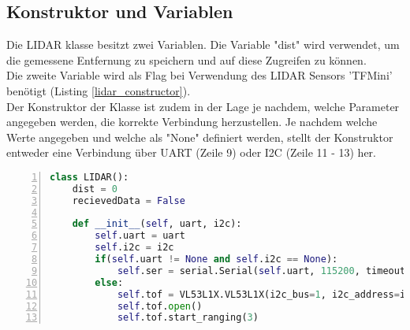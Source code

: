 \subsection{Konstruktor und Variablen}
Die \ac{LIDAR} klasse besitzt zwei Variablen. Die Variable "dist" wird verwendet, um die gemessene Entfernung zu speichern und auf diese Zugreifen zu können.\\
Die zweite Variable wird als Flag bei Verwendung des \ac{LIDAR} Sensors 'TFMini'  benötigt (Listing \ref{lidar_constructor}).\\
Der Konstruktor der Klasse ist zudem in der Lage je nachdem, welche Parameter angegeben werden, die korrekte Verbindung herzustellen. Je nachdem welche Werte angegeben und welche als "None"  definiert werden, stellt der Konstruktor entweder eine Verbindung über \ac{UART} (Zeile 9) oder \ac{I2C} (Zeile 11 - 13) her. 
\begin{lstlisting}[caption={Kostruktor der Lidar Klasse}, language={Python}, label={lidar_constructor}, numbers=left]
class LIDAR():
    dist = 0
    recievedData = False

    def __init__(self, uart, i2c):
        self.uart = uart
        self.i2c = i2c
        if(self.uart != None and self.i2c == None):
            self.ser = serial.Serial(self.uart, 115200, timeout=1)
        else:
            self.tof = VL53L1X.VL53L1X(i2c_bus=1, i2c_address=i2c)
            self.tof.open()
            self.tof.start_ranging(3)
\end{lstlisting}
